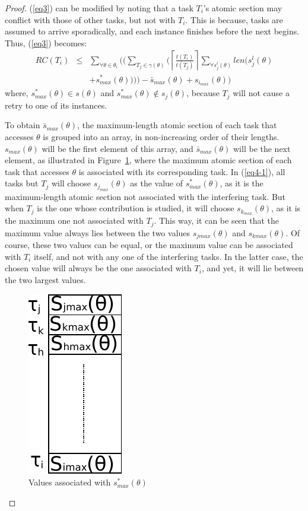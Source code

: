 \documentclass[a4paper,english]{article}
\newtheorem{proof}{Proof}
\begin{document}
\begin{proof}\normalfont
(\ref{eq3}) can be modified by noting that a task $T_i$'s atomic section 
may conflict with those of other tasks, but not with $T_i$. 
This is because, tasks are assumed to arrive sporadically, and  each instance finishes before the next begins. 
Thus, (\ref{eq3}) becomes:
\begin{eqnarray}
RC(T_{i}) & \le & \sum_{\forall\theta\in\theta_{i}} \Big( \Big(\sum_{T_{j}\in\gamma(\theta)} \Big(\left\lceil\frac{t\left(T_{i}\right)}{t\left(T_{j}\right)}\right\rceil\sum_{\forall s_{j}^{l}(\theta)}len \big(s_{j}^{l}(\theta)\nonumber \\
 &  & +s_{max}^{*}(\theta) \big) \Big) \Big)-\bar{s}_{max}(\theta)+s_{i_{max}}(\theta) \Big)\label{eq4-1}\end{eqnarray}
where, $s_{max}^{*}(\theta)\in s(\theta)$ and $s_{max}^{*}(\theta)\not\in s_{j}(\theta)$, 
because $T_{j}$ will not cause a retry to one of its instances.


To obtain $\bar{s}{}_{max}(\theta)$, the maximum-length atomic section of each task that accesses $\theta$ is grouped into an array, in non-increasing order of their lengths. $s_{max}(\theta)$ will be the first element of this array, and $\bar{s}_{max}(\theta)$ will be the next element, as illustrated in Figure~\ref{fig7}, where the maximum atomic
section of each task that accesses $\theta$ is associated with
its corresponding task. In (\ref{eq4-1}), all tasks
but $T_{j}$ will choose $s_{j_{max}}(\theta)$ as the value of $s_{max}^{*}(\theta)$,
as it is the maximum-length atomic section not associated with the interfering task. 
But when $T_{j}$ is the one whose contribution is studied,
it will choose $s_{k_{max}}(\theta)$, as it is the maximum one not
associated with $T_{j}$. This way, it can be seen that the maximum
value always lies between the two values $s_{jmax}(\theta)$ and $s_{kmax}(\theta)$. 
Of course, these two values can be equal, or the maximum value can be associated with $T_i$ itself, and not with any one of the interfering tasks. In the latter case,
the chosen value will always be the one associated with $T_i$, and yet, it will lie between the two largest values. 

\begin{figure}[htbp]
\centering
\includegraphics[scale=0.7]{figures/figure7}
\caption{\label{fig7}Values associated with $s_{max}^{*}(\theta)$}
\end{figure}



\end{proof}
\end{document}

